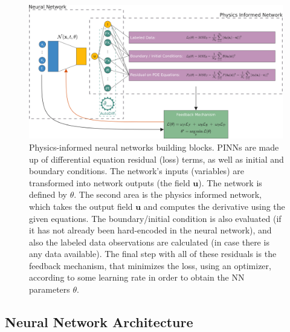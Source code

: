 \documentclass[pdflatex,sn-basic]{sn-jnl}%
\theoremstyle{thmstyleone}%
\theoremstyle{thmstyletwo}%
\theoremstyle{thmstylethree}%
\begin{document}
\begin{figure}[htbp]
    \centering
    \includegraphics[width=0.99\textwidth]{info_pinn}
    \caption{%
Physics-informed neural networks building blocks. 
PINNs are made up of differential equation residual (loss) terms, as well as initial  and boundary conditions.
The network's inputs (variables) are transformed into network outputs (the field $\bm{u}$). 
The network is defined by $\theta$.
The second area is the physics informed network, which takes the output field $\bm{u}$ and computes the derivative using the given equations. The boundary/initial condition is also evaluated (if it has not already been hard-encoded in the neural network), and also the labeled data observations are calculated (in case there is any data available).
The final step with all of these residuals is the feedback mechanism, that minimizes the loss, using an optimizer, according to some learning rate in order to obtain the NN parameters  $\theta$. %
}
    \label{fig:PINN}
\end{figure}




\subsection{Neural Network Architecture}
\end{document}
